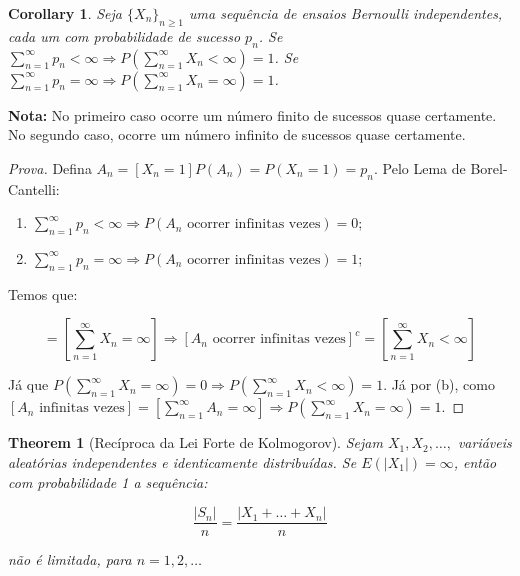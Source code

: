 \documentclass[
]{article}
\newtheorem{theorem}{Theorem}[section]
\newtheorem{corollary}{Corollary}[section]
\theoremstyle{definition}
\theoremstyle{definition}
\theoremstyle{definition}
\theoremstyle{definition}
\theoremstyle{remark}
\begin{document}
\begin{corollary}
Seja \(\{X_{n}\}_{n \ge 1}\) uma sequência de ensaios Bernoulli independentes, cada um com probabilidade de sucesso \(p_{n}\). Se \(\sum_{n=1}^{\infty}p_{n} < \infty \Rightarrow P\left(\sum_{n=1}^{\infty}X_{n} < \infty\right) = 1\). Se \(\sum_{n=1}^{\infty}p_{n} = \infty \Rightarrow P\left(\sum_{n=1}^{\infty}X_{n} = \infty\right) = 1\).
\end{corollary}

\textbf{Nota:} No primeiro caso ocorre um número finito de sucessos quase certamente. No segundo caso, ocorre um número infinito de sucessos quase certamente.

\begin{proof}[Prova]
Defina \(A_{n} = [X_{n} = 1]P(A_{n}) = P(X_{n} = 1) = p_{n}\). Pelo Lema de Borel-Cantelli:

\begin{enumerate}
\def\labelenumi{\alph{enumi})}
\item
  \(\sum_{n=1}^{\infty}p_{n} < \infty \Rightarrow P(A_{n} \text{ ocorrer infinitas vezes}) = 0\);
\item
  \(\sum_{n=1}^{\infty}p_{n} = \infty \Rightarrow P(A_{n} \text{ ocorrer infinitas vezes}) = 1\);
\end{enumerate}

Temos que:

\begin{equation*}
[A_{n} \text{ ocorrer infinitas vezes}] = \left[\sum_{n=1}^{\infty}X_{n} = \infty\right] \Rightarrow [A_{n} \text{ ocorrer infinitas vezes}]^{c} = \left[\sum_{n=1}^{\infty}X_{n} < \infty\right]
\end{equation*}

Já que \(P\left(\sum_{n=1}^{\infty}X_{n} = \infty\right) = 0 \Rightarrow P\left(\sum_{n=1}^{\infty}X_{n} < \infty\right) = 1\). Já por (b), como \([A_{n} \text{ infinitas vezes}] = \left[\sum_{n=1}^{\infty}A_{n} = \infty\right] \Rightarrow P\left(\sum_{n=1}^{\infty}X_{n} = \infty\right) = 1\).
\end{proof}

\begin{theorem}[Recíproca da Lei Forte de Kolmogorov]
Sejam \(X_{1},X_{2},\ldots,\) variáveis aleatórias independentes e identicamente distribuídas. Se \(E(|X_{1}|) = \infty\), então com probabilidade 1 a sequência:

\begin{equation*}
\frac{|S_{n}|}{n} = \frac{|X_{1} + \ldots + X_{n}|}{n}
\end{equation*}

não é limitada, para \(n = 1,2,\ldots\)
\end{theorem}
\end{document}
